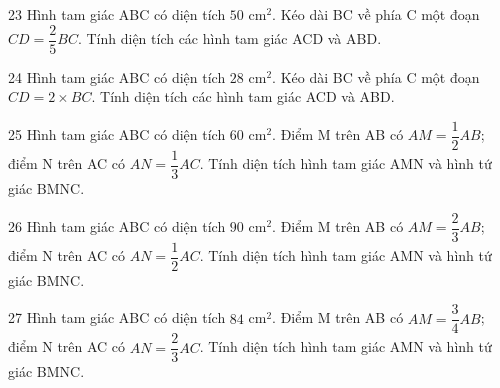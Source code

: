 \gap
\begin{probbox}{23}{\relax}
Hình tam giác ABC có diện tích $50$ cm$^2$. Kéo dài BC về phía C một đoạn $CD=\dfrac25BC$. Tính diện tích các hình tam giác ACD và ABD.
\end{probbox}
\gap
\begin{probbox}{24}{\relax}
Hình tam giác ABC có diện tích $28$ cm$^2$. Kéo dài BC về phía C một đoạn $CD=2\times BC$. Tính diện tích các hình tam giác ACD và ABD.
\end{probbox}
\gap
\begin{probbox}{25}{\relax}
Hình tam giác ABC có diện tích $60$ cm$^2$. Điểm M trên AB có $AM=\dfrac{1}{2}AB$; điểm N trên AC có $AN=\dfrac{1}{3}AC$. Tính diện tích hình tam giác AMN và hình tứ giác BMNC.
\end{probbox}
\gap
\begin{probbox}{26}{\relax}
Hình tam giác ABC có diện tích $90$ cm$^2$. Điểm M trên AB có $AM=\dfrac{2}{3}AB$; điểm N trên AC có $AN=\dfrac{1}{2}AC$. Tính diện tích hình tam giác AMN và hình tứ giác BMNC.
\end{probbox}
\gap
\begin{probbox}{27}{\relax}
Hình tam giác ABC có diện tích $84$ cm$^2$. Điểm M trên AB có $AM=\dfrac{3}{4}AB$; điểm N trên AC có $AN=\dfrac{2}{3}AC$. Tính diện tích hình tam giác AMN và hình tứ giác BMNC.
\end{probbox}
